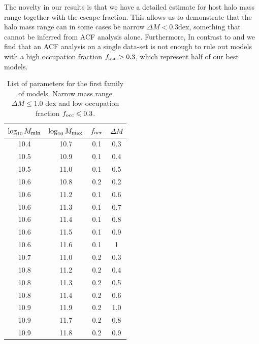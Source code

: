 \documentclass[usenatbib]{mn2e}
\begin{document}
The novelty in our results is that we have a detailed estimate for 
host halo mass range together with the escape fraction. This allows us
to demonstrate that the halo mass range can in some cases be narrow $\Delta M <
0.3$dex, something that cannot be inferred from ACF analysis alone.
Furthermore, In contrast to \citep{Gawiser07} and \citep{Ouchi2010} we
find that an ACF analysis on a single data-set is not enough to rule
out models with a high occupation fraction $f_{\rm occ}>0.3$, which
represent half of our best models. 



\begin{table}
\begin{center}
\begin{tabular}{cccc}\hline\hline
$\log_{10}M_{\rm min}$ & $\log_{10}M_{\rm max}$ & $f_{\rm occ}$ & $\Delta M$\\\hline
 10.4 &10.7 & 0.1& 0.3 \\
 10.5 &10.9 & 0.1& 0.4 \\
 10.5 &11.0 & 0.1& 0.5 \\
 10.6 &10.8 & 0.2& 0.2 \\
 10.6 &11.2 & 0.1& 0.6 \\
 10.6 &11.3 & 0.1& 0.7 \\
 10.6 &11.4 & 0.1& 0.8 \\
 10.6 &11.5 & 0.1& 0.9 \\
 10.6 &11.6 & 0.1& 1 \\
 10.7 &11.0 & 0.2& 0.3 \\
 10.8 &11.2 & 0.2& 0.4 \\
 10.8 &11.3 & 0.2& 0.5 \\
 10.8 &11.4 & 0.2& 0.6 \\
 10.9 &11.9 & 0.2& 1.0 \\
 10.9 &11.7 & 0.2& 0.8 \\
 10.9 &11.8 & 0.2& 0.9 \\\hline
\end{tabular}
\end{center}
\caption{\label{table:firstfamily}
List of parameters for the first
  family of models. Narrow mass range $\Delta M\leq 1.0$ dex and low
  occupation fraction $f_{\rm occ}\leq 0.3$.} 
\end{table}
\end{document}
